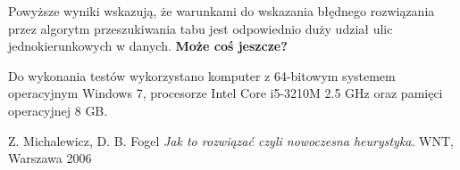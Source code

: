 \documentclass[11pt,a4paper,twoside]{article}
\begin{document}
Powyższe wyniki wskazują, że warunkami do wskazania błędnego rozwiązania przez algorytm przeszukiwania tabu jest odpowiednio duży udział ulic jednokierunkowych w danych. \textbf{Może coś jeszcze?}

Do wykonania testów wykorzystano komputer z 64-bitowym systemem operacyjnym Windows 7, procesorze Intel Core i5-3210M 2.5 GHz oraz pamięci operacyjnej 8 GB. 

  
\begin{thebibliography}{9}
Z. Michalewicz, D. B. Fogel
\emph{Jak to rozwiązać czyli nowoczesna heurystyka}.
WNT, Warszawa 2006
\end{thebibliography}
\end{document}
